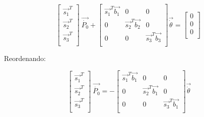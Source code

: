         \begin{Center}
             \[  \left[ \begin{matrix}
            \overrightarrow{s_{1}}^{T}\\
            \overrightarrow{s_{2}}^{T}\\
            \overrightarrow{s_{3}}^{T}\\
            \end{matrix}
             \right] ~\overrightarrow{\dot{P_{0}}}+ \left[ \begin{matrix}
            \overrightarrow{s_{1}}^{T}\overrightarrow{b_{1}}  &  0  &  0\\
            0  &  \overrightarrow{s_{2}}^{T}\overrightarrow{b_{2}}  &  0\\
            0  &  0  &  \overrightarrow{s_{3}}^{T}\overrightarrow{b_{3}}\\
            \end{matrix}
             \right] \overrightarrow{\dot{ \theta }}= \left[ \begin{matrix}
            0\\
            0\\
            0\\
            \end{matrix}
             \right] ~ \] 
        \end{Center}
        
        Reordenando:
        
        \begin{Center}
             \[  \left[ \begin{matrix}
            \overrightarrow{s_{1}}^{T}\\
            \overrightarrow{s_{2}}^{T}\\
            \overrightarrow{s_{3}}^{T}\\
            \end{matrix}
             \right] ~\overrightarrow{\dot{P_{0}}}=- \left[ \begin{matrix}
            \overrightarrow{s_{1}}^{T}\overrightarrow{b_{1}}  &  0  &  0\\
            0  &  \overrightarrow{s_{2}}^{T}\overrightarrow{b_{1}}  &  0\\
            0  &  0  &  \overrightarrow{s_{3}}^{T}\overrightarrow{b_{1}}\\
            \end{matrix}
             \right] \overrightarrow{\dot{ \theta }} \] 
        \end{Center}
        
